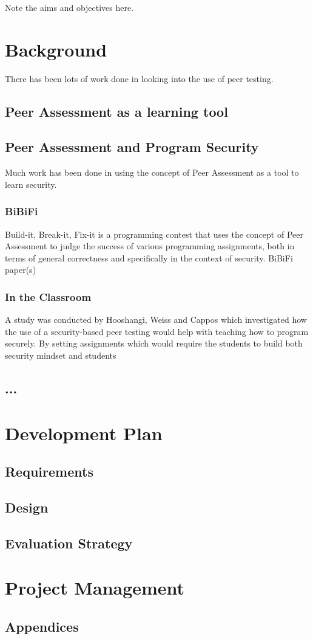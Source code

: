 \documentclass[a4paper,11pt]{report}
\begin{document}
Note the aims and objectives here.

\chapter{Background}
There has been lots of work done in looking into the use of peer testing.
\section{Peer Assessment as a learning tool}

\section{Peer Assessment and Program Security}
Much work has been done in using the concept of Peer Assessment as a tool to learn security.
\subsection{BiBiFi}
Build-it, Break-it, Fix-it is a programming contest that uses the concept of Peer Assessment to judge the success of various programming assignments, both in terms of general correctness and specifically in the context of security.
BiBiFi paper(s)\\


\subsection{In the Classroom}
A study was conducted by Hooshangi, Weiss and Cappos \cite{hooshangi_can_2015} which investigated how the use of a security-based peer testing would help with teaching how to program securely. By setting assignments which would require the students to build both 
security mindset and students

\section{...}


\chapter{Development Plan}

\section{Requirements}

\section{Design}

\section{Evaluation Strategy}

\chapter{Project Management}

{}


\section*{Appendices}
\end{document}

